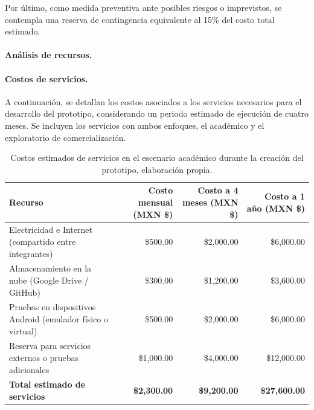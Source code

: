 Por último, como medida preventiva ante posibles riesgos o imprevistos, se contempla una reserva de contingencia equivalente al 15\% del costo total estimado.


\paragraph{\textbf{Análisis de recursos.}} 
\paragraph{\textbf{Costos de servicios.}} 
A continuación, se detallan los costos asociados a los servicios necesarios para el desarrollo del prototipo, considerando un periodo estimado de ejecución de cuatro meses. Se incluyen los servicios con ambos enfoques, el académico y el exploratorio de comercialización.


\begin{table}[H]
	\centering
	\renewcommand{\arraystretch}{1.6}
	\setlength{\tabcolsep}{12pt}
	\Huge %
	\begin{adjustbox}{max width=\textwidth}
		\begin{tabular}{|p{7cm}|r|r|r|}
			\hline
			\textbf{Recurso} & \textbf{Costo mensual (MXN \$)} & \textbf{Costo a 4 meses (MXN \$)} & \textbf{Costo a 1 año (MXN \$)} \\ \hline
			Electricidad e Internet (compartido entre integrantes) & \$500.00 & \$2,000.00 & \$6,000.00 \\ \hline
			Almacenamiento en la nube (Google Drive / GitHub) & \$300.00 & \$1,200.00 & \$3,600.00 \\ \hline
			Pruebas en dispositivos Android (emulador físico o virtual) & \$500.00 & \$2,000.00 & \$6,000.00 \\ \hline
			Reserva para servicios externos o pruebas adicionales & \$1,000.00 & \$4,000.00 & \$12,000.00 \\ \hline
			\textbf{Total estimado de servicios} & \textbf{\$2,300.00} & \textbf{\$9,200.00} & \textbf{\$27,600.00} \\ \hline
		\end{tabular}
	\end{adjustbox}
	\caption[Costos estimados de servicios en el escenario académico durante la creación del prototipo]{Costos estimados de servicios en el escenario académico durante la creación del prototipo, elaboración propia.}
	\label{tab:costos_servicios}
\end{table}



